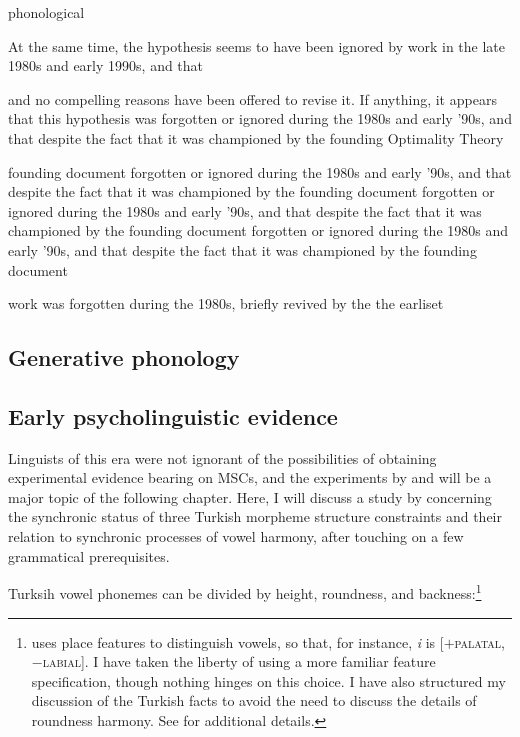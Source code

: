 \citet{Dell1973}

\citet{Anderson1974}

\citet{Kenstowicz1979}

phonological

At the same time, the hypothesis seems to have been ignored by work in the late 1980s and early 1990s, and that 

and no compelling reasons have been offered to revise it. If anything, it appears that this hypothesis was forgotten or ignored during the 1980s and early '90s, and that despite the fact that it was championed by the founding Optimality Theory


 founding document forgotten or ignored during the 1980s and early '90s, and that despite the fact that it was championed by the founding document forgotten or ignored during the 1980s and early '90s, and that despite the fact that it was championed by the founding document forgotten or ignored during the 1980s and early '90s, and that despite the fact that it was championed by the founding document 

 work was forgotten during the 1980s, briefly revived by the the earliset 

\subsection{Generative phonology}


\subsection{Early psycholinguistic evidence}

Linguists of this era were not ignorant of the possibilities of obtaining experimental evidence bearing on MSCs, and the experiments by \citet{Greenberg1964} and \citet{Scholes1966} will be a major topic of the following chapter. Here, I will discuss a study by \citet{Zimmer1969} concerning the synchronic status of three Turkish morpheme structure constraints and their relation to synchronic processes of vowel harmony, after touching on a few grammatical prerequisites.

Turksih vowel phonemes can be divided by height, roundness, and backness:\footnote{\citeauthor{Zimmer1969} uses place features to distinguish vowels, so that, for instance, \emph{i} is [$+$\textsc{palatal}, $-$\textsc{labial}]. I have taken the liberty of using a more familiar feature specification, though nothing hinges on this choice. I have also structured my discussion of the Turkish facts to avoid the need to discuss the details of roundness harmony. See \citealt{Zimmer1969} for additional details.}

